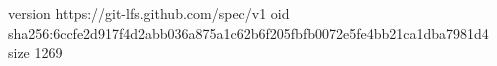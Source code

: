 version https://git-lfs.github.com/spec/v1
oid sha256:6ccfe2d917f4d2abb036a875a1c62b6f205fbfb0072e5fe4bb21ca1dba7981d4
size 1269
